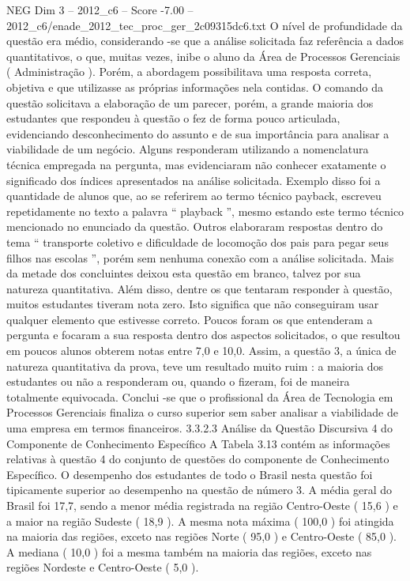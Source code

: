 \begin{textsample}{NEG Dim 3 – 2012\_c6 – Score -7.00 – 2012\_c6/enade\_2012\_tec\_proc\_ger\_2c09315dc6.txt}
O nível de profundidade da questão era médio, considerando -se que a análise solicitada faz referência a dados quantitativos, o que, muitas vezes, inibe o aluno da Área de Processos Gerenciais ( Administração ).
Porém, a abordagem possibilitava uma resposta correta, objetiva e que utilizasse as próprias informações nela contidas.
O comando da questão solicitava a elaboração de um parecer, porém, a grande maioria dos estudantes que respondeu à questão o fez de forma pouco articulada, evidenciando desconhecimento do assunto e de sua importância para analisar a viabilidade de um negócio.
Alguns responderam utilizando a nomenclatura técnica empregada na pergunta, mas evidenciaram não conhecer exatamente o significado dos índices apresentados na análise solicitada.
Exemplo disso foi a quantidade de alunos que, ao se referirem ao termo técnico payback, escreveu repetidamente no texto a palavra “ playback ”, mesmo estando este termo técnico mencionado no enunciado da questão.
Outros elaboraram respostas dentro do tema “ transporte coletivo e dificuldade de locomoção dos pais para pegar seus filhos nas escolas ”, porém sem nenhuma conexão com a análise solicitada.
Mais da metade dos concluintes deixou esta questão em branco, talvez por sua natureza quantitativa.
Além disso, dentre os que tentaram responder à questão, muitos estudantes tiveram nota zero.
Isto significa que não conseguiram usar qualquer elemento que estivesse correto.
Poucos foram os que entenderam a pergunta e focaram a sua resposta dentro dos aspectos solicitados, o que resultou em poucos alunos obterem notas entre 7,0 e 10,0.
Assim, a questão 3, a única de natureza quantitativa da prova, teve um resultado muito ruim : a maioria dos estudantes ou não a responderam ou, quando o fizeram, foi de maneira totalmente equivocada.
Conclui -se que o profissional da Área de Tecnologia em Processos Gerenciais finaliza o curso superior sem saber analisar a viabilidade de uma empresa em termos financeiros. 3.3.2.3 Análise da Questão Discursiva 4 do Componente de Conhecimento Específico A Tabela 3.13 contém as informações relativas à questão 4 do conjunto de questões do componente de Conhecimento Específico.
O desempenho dos estudantes de todo o Brasil nesta questão foi tipicamente superior ao desempenho na questão de número 3.
A média geral do Brasil foi 17,7, sendo a menor média registrada na região Centro-Oeste ( 15,6 ) e a maior na região Sudeste ( 18,9 ).
A mesma nota máxima ( 100,0 ) foi atingida na maioria das regiões, exceto nas regiões Norte ( 95,0 ) e Centro-Oeste ( 85,0 ).
A mediana ( 10,0 ) foi a mesma também na maioria das regiões, exceto nas regiões Nordeste e Centro-Oeste ( 5,0 ).

\end{textsample}
